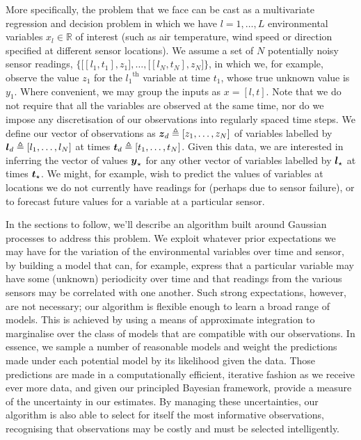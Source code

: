\documentclass{acmtrans2m}
\begin{document}
More specifically, the problem that we face can be cast as a multivariate regression and decision problem in which we have $l=1,\ldots, L$ environmental variables $x_l \in \mathbb{R}$ of interest (such as air temperature, wind speed or direction specified at different sensor locations). We assume a set of $N$ potentially noisy sensor readings, $ \bigl\{\bigl[[l_1,t_1],z_1\bigr],\ldots,\bigl[[l_N,t_N],z_N\bigr]\bigr\}$, in which we, for example, observe the value $z_1$ for the ${l_1}^\text{th}$ variable at time $t_1$, whose true unknown value is $y_1$. Where convenient, we may group the inputs as $x=[l,t]$. Note that we do not require that all the variables are observed at the same time, nor do we impose any discretisation of our observations into regularly spaced time steps. We define our vector of observations as $\boldsymbol{z}_d\triangleq[z_1,\ldots,z_N]$ of variables labelled by $\boldsymbol{l}_d\triangleq[l_1,\ldots,l_N]$ at times $\boldsymbol{t}_d\triangleq[t_1,\ldots,t_N]$. Given this data, we are interested in inferring the vector of values $\boldsymbol{y}_\star$ for any other vector of variables labelled by $\boldsymbol{l}_\star$ at times $\boldsymbol{t}_\star$. We might, for example, wish to predict the values of variables at locations we do not currently have readings for (perhaps due to sensor failure), or to forecast future values for a variable at a particular sensor.  

In the sections to follow, we'll describe an algorithm built around Gaussian processes to address this problem. We exploit whatever prior expectations we may have for the variation of the environmental variables over time and sensor, by building a model that can, for example, express that a particular variable may have some (unknown) periodicity over time and that readings from the various sensors may be correlated with one another. Such strong expectations, however, are not necessary; our algorithm is flexible enough to learn a broad range of models. This is achieved by using a means of approximate integration to marginalise over the class of models that are compatible with our observations. In essence, we sample a number of reasonable models and weight the predictions made under each potential model by its likelihood given the data. Those predictions are made in a computationally efficient, iterative fashion as we receive ever more data, and given our principled Bayesian framework, provide a measure of the uncertainty in our estimates. By managing these uncertainties, our algorithm is also able to select for itself the most informative observations, recognising that observations may be costly and must be selected intelligently.  
\end{document}
